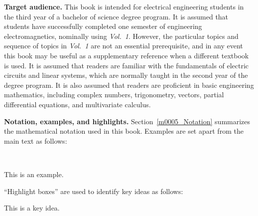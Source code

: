  
{\bf Target audience.}
This book is intended for electrical engineering students in the third year of a bachelor of science degree program.
It is assumed that students have successfully completed one semester of engineering electromagnetics, nominally using \emph{Vol.~1}.
However, the particular topics and sequence of topics in \emph{Vol.~1} are not an essential prerequisite, and in any event this book may be useful as a supplementary reference when a different textbook is used.
It is assumed that readers are familiar with the fundamentals of electric circuits and linear systems, which are normally taught in the second year of the degree program.  
It is also assumed that readers are proficient in basic engineering mathematics, including 
complex numbers,
trigonometry,
vectors,
partial differential equations,
and multivariate calculus.

{\bf Notation, examples, and highlights.}
Section~\ref{m0005_Notation} summarizes the mathematical notation used in this book.
Examples are set apart from the main text as follows:

~\\ \begin{example} 
\begin{mdframed}[backgroundcolor=brown!20,linecolor=brown!20]\raggedright
This is an example.
\end{mdframed}
\end{example}

``Highlight boxes'' are used to identify key ideas as follows:

\begin{mdframed}[backgroundcolor=yellow!20,nobreak=true] 
This is a key idea.
\end{mdframed}

